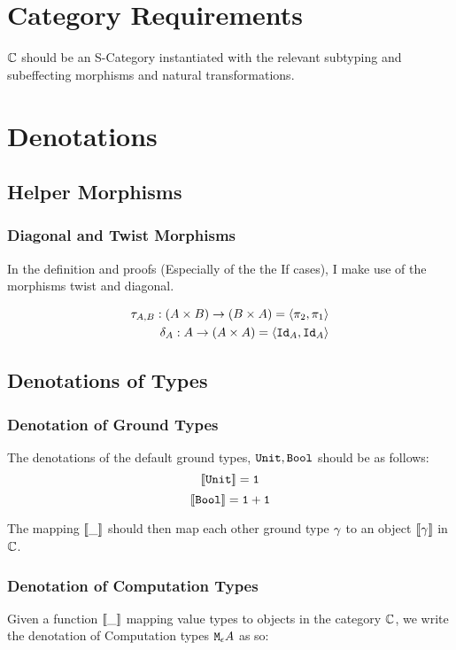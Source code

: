 \documentclass{report}
\begin{document}
\chapter{Category Requirements}
$\mathbb{C}$ should be an S-Category instantiated with the relevant subtyping and subeffecting morphisms and natural transformations.

\chapter{Denotations}
\section{Helper Morphisms}
\subsection{Diagonal and Twist Morphisms}

In the definition and proofs (Especially of the the If cases), I make use of the morphisms twist and diagonal.

\begin{align*}
    \tau_{A, B}: (A\times B) \rightarrow (B\times A) = \langle\pi_2, \pi_1\rangle\\
    \delta_{A}: A \rightarrow (A\times A)  = \langle\texttt{Id}_{A}, \texttt{Id}_{A}\rangle
\end{align*}

\section{Denotations of Types}
\subsection{Denotation of Ground Types}
The denotations of the default ground types, $\texttt{Unit}, \texttt{Bool}$ should be as follows:
\begin{equation}
    {\bf [\![}\texttt{Unit}{\bf ]\!]} = \texttt{1}
\end{equation}
\begin{equation}
    {\bf [\![}\texttt{Bool}{\bf ]\!]} = \texttt{1} + \texttt{1}
\end{equation}

The mapping ${\bf [\![}\_{\bf ]\!]}$ should then map each other ground type $\gamma$ to an object ${\bf [\![}\gamma{\bf ]\!]}$ in $\mathbb{C}$.

\subsection{Denotation of Computation Types}
Given a function ${\bf [\![}\_{\bf ]\!]}$ mapping value types to objects in the category $\mathbb{C}$, we write the denotation of Computation types $\texttt{M}_{\epsilon}{A}$ as so:
\end{document}
